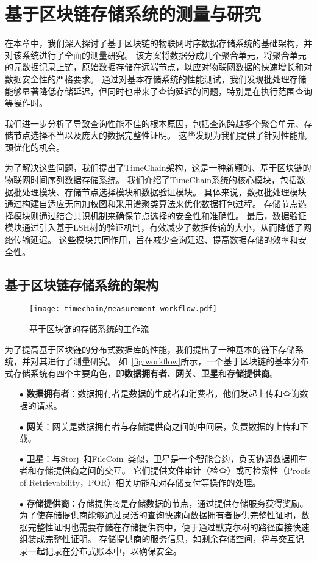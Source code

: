 \chapter{基于区块链存储系统的测量与研究}
\label{sec:baseline}
在本章中，我们深入探讨了基于区块链的物联网时序数据存储系统的基础架构，并对该系统进行了全面的测量研究。
该方案将数据分成几个聚合单元，将聚合单元的元数据记录上链，原始数据存储在远端节点，以应对物联网数据的快速增长和对数据安全性的严格要求。
通过对基本存储系统的性能测试，我们发现批处理存储能够显著降低存储延迟，但同时也带来了查询延迟的问题，特别是在执行范围查询等操作时。

我们进一步分析了导致查询性能不佳的根本原因，包括查询跨越多个聚合单元、存储节点选择不当以及庞大的数据完整性证明。
这些发现为我们提供了针对性能瓶颈优化的机会。

为了解决这些问题，我们提出了TimeChain架构，这是一种新颖的、基于区块链的物联网时间序列数据存储系统。
我们介绍了TimeChain系统的核心模块，包括数据批处理模块、存储节点选择模块和数据验证模块。
具体来说，数据批处理模块通过构建自适应无向加权图和采用谱聚类算法来优化数据打包过程。
存储节点选择模块则通过结合共识机制来确保节点选择的安全性和准确性。
最后，数据验证模块通过引入基于LSH树的验证机制，有效减少了数据传输的大小，从而降低了网络传输延迟。
这些模块共同作用，旨在减少查询延迟、提高数据存储的效率和安全性。

\section{基于区块链存储系统的架构}

\begin{figure}[t]
    \centering
    \texttt{[image: timechain/measurement\_workflow.pdf]}
    \caption{基于区块链的存储系统的工作流}
    \label{fig:workflow}
\end{figure}

为了提高基于区块链的分布式数据库的性能，我们提出了一种基本的链下存储系统，并对其进行了测量研究。
如~\autoref{fig:workflow}所示，一个基于区块链的基本分布式存储系统有四个主要角色，即\textbf{数据拥有者}、\textbf{网关}、\textbf{卫星}和\textbf{存储提供商}。

\begin{itemize}
    \item[$\bullet$] \textbf{数据拥有者}：数据拥有者是数据的生成者和消费者，他们发起上传和查询数据的请求。
    \item[$\bullet$] \textbf{网关}：网关是数据拥有者与存储提供商之间的中间层，负责数据的上传和下载。
    \item[$\bullet$] \textbf{卫星}：与Storj~\cite{storj2018storj}和FileCoin~\cite{bauer2022filecoin}类似，卫星是一个智能合约，负责协调数据拥有者和存储提供商之间的交互。
    它们提供文件审计（检查）或可检索性（Proofs of Retrievability，POR）相关功能和对存储支付等操作的处理。
    \item[$\bullet$] \textbf{存储提供商}：存储提供商是存储数据的节点，通过提供存储服务获得奖励。
    为了使存储提供商能够通过灵活的查询快速向数据拥有者提供完整性证明，数据完整性证明也需要存储在存储提供商中，便于通过默克尔树的路径直接快速组装成完整性证明。
    存储提供商的服务信息，如剩余存储空间，将与交互记录一起记录在分布式账本中，以确保安全。
\end{itemize}

